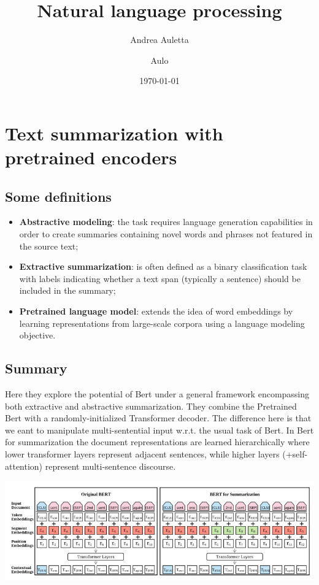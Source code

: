 \documentclass[12pt]{article}
\title{Natural language processing}
\author{
    Andrea Auletta
    \and
    Aulo
}
\date{\today}
\begin{document}
\maketitle
\tableofcontents
\newpage


\section{Text summarization with pretrained encoders}
\subsection{Some definitions}
\begin{itemize}
    \item \textbf{Abstractive modeling}: the task requires language generation capabilities in order to create 
    summaries containing novel words and phrases not featured in the source text;
    \item \textbf{Extractive summarization}: is often defined as a binary classification task with labels 
    indicating whether a text span (typically a sentence) should be included in the summary;
    \item \textbf{Pretrained language model}: extends the idea of word embeddings by learning representations
    from large-scale corpora using a language modeling objective.
\end{itemize}
\subsection{Summary}
Here they explore the potential of Bert under a general framework encompassing both extractive 
and abstractive summarization. They combine the Pretrained Bert with a randomly-initialized Transformer 
decoder. The difference here is that we eant to manipulate multi-sentential input w.r.t. the usual task of Bert.
In Bert for summarization the document representations are learned hierarchically where lower transformer layers
represent adjacent sentences, while higher layers (+self-attention) represent multi-sentence discourse.
\begin{center}
    \includegraphics[scale=0.6]{./img/bert.png}
\end{center}
\end{document}
